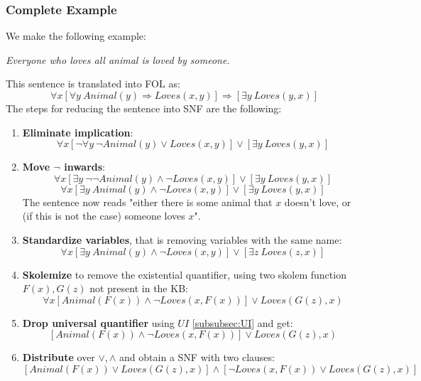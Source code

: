 \documentclass[10pt,a4paper]{article}
\begin{document}
\subsubsection{Complete Example}
We make the following example:
\begin{center}
\textit{Everyone who loves all animal is loved by someone.}
\end{center} 
This sentence is translated into FOL as:
\[\forall x[ \forall y\ Animal(y)\Rightarrow Loves(x,y)]\Rightarrow [\exists y\ Loves(y,x)]\]
The steps for reducing the sentence into SNF are the following:
\begin{enumerate}

\item \textbf{Eliminate implication}:
\[\forall x[ \neg \forall y\ \neg Animal(y)\vee Loves(x,y)]\vee [\exists y\ Loves(y,x)]\]
\item \textbf{Move $\neg$ inwards}:
\[\forall x[ \exists y\ \neg \neg Animal(y)\wedge \neg Loves(x,y)]\vee [\exists y\ Loves(y,x)]\]
\[\forall x[ \exists y\ Animal(y)\wedge \neg Loves(x,y)]\vee [\exists y\ Loves(y,x)]\]
The sentence now reads "either there is some animal that $x$ doesn't love, or (if this is not the case) someone loves $x$".

\item \textbf{Standardize variables}, that is removing variables with the same name:
\[\forall x[ \exists y\ Animal(y)\wedge \neg Loves(x,y)]\vee [\exists z\ Loves(z,x)]\]

\item \textbf{Skolemize} to remove the existential quantifier, using two skolem function $F(x),G(z)$ not present in the KB:
  \[\forall x[ Animal(F(x))\wedge \neg Loves(x,F(x))]\vee Loves(G(z),x)\]

\item \textbf{Drop universal quantifier} using $UI$ \ref{subsubsec:UI} and get:
\[[ Animal(F(x))\wedge \neg Loves(x,F(x))]\vee Loves(G(z),x)\]
\item \textbf{Distribute} over $\vee,\wedge$ and obtain a SNF with two clauses:
\[[ Animal(F(x))\vee Loves(G(z),x)]\wedge[\neg Loves(x,F(x)) \vee  Loves(G(z),x)]\]

\end{enumerate}
\end{document}
